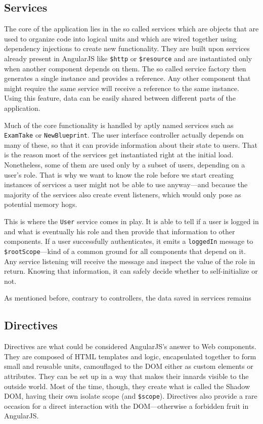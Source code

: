 \documentclass[thesis=M,english,hidelinks]{FITthesis}[2012/10/20]
\newcommand{\code}{\texttt}
\begin{document}
  \subsection{Services}

The core of the application lies in the so called services which are objects that are used to organize code into logical units and which are wired together using dependency injections to create new functionality. They are built upon services already present in AngularJS like \code{\$http} or \code{\$resource}  and are instantiated only when another component depends on them. The so called service factory then generates a single instance and provides a reference. Any other component that might require the same service will receive a reference to the same instance. Using this feature, data can be easily shared between different parts of the application.

Much of the core functionality is handled by aptly named services such as \code{ExamTake} or \code{NewBlueprint}. The user interface controller actually depends on many of these, so that it can provide information about their state to users. That is the reason most of the services get instantiated right at the initial load. Nonetheless, some of them are used only by a subset of users, depending on a user's role. That is why we want to know the role before we start creating instances of services a user might not be able to use anyway---and because the majority of the services also create event listeners, which would only pose as potential memory hogs.

This is where the \code{User} service comes in play. It is able to tell if a user is logged in and what is eventually his role and then provide that information to other components. If a user successfully authenticates, it emits a \code{loggedIn} message to \code{\$rootScope}---kind of a common ground for all components that depend on it. Any service listening will receive the message and inspect the value of the role in return. Knowing that information, it can safely decide whether to self-initialize or not.

As mentioned before, contrary to controllers, the data saved in services remains

  \subsection{Directives}

Directives are what could be considered AngularJS's answer to Web components. They are composed of HTML templates and logic, encapsulated together to form small and reusable units, camouflaged to the DOM either as custom elements or attributes. They can be set up in a way that makes their innards visible to the outside world. Most of the time, though, they create what is called the Shadow DOM, having their own isolate scope (and \code{\$scope}). Directives also provide a rare occasion for a direct interaction with the DOM---otherwise a forbidden fruit in AngularJS.
\end{document}

